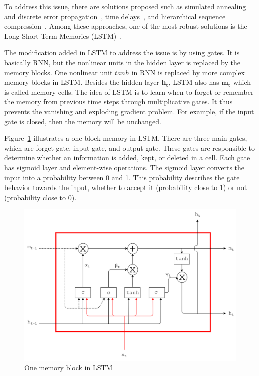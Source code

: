 To address this issue, there are solutions proposed such as simulated annealing and discrete error propagation~\citep{bengio1994learning}, time delays~\citep{lang1990time}, and hierarchical sequence compression~\citep{schmidhuber2007training}. Among these approaches, one of the most robust solutions is the Long Short Term Memories (LSTM)~\citep{hochreiter1997long}. 

The modification added in LSTM to address the issue is by using gates. It is basically RNN, but the nonlinear units in the hidden layer is replaced by the memory blocks. One nonlinear unit $tanh$ in RNN is replaced by more complex memory blocks in LSTM. Besides the hidden layer $\mathbf{h_{t}}$, LSTM also has $\mathbf{m_{t}}$ which is called memory cells.  The idea of LSTM is to learn when to forget or remember the memory from previous time steps through multiplicative gates. It thus prevents the vanishing and exploding gradient problem. For example, if the input gate is closed, then the memory will be unchanged.

Figure~\ref{fig:lstm} illustrates a one block memory in LSTM. There are three main gates, which are forget gate, input gate, and output gate. These gates are responsible to determine whether an information is added, kept, or deleted in a cell. Each gate has sigmoid layer and element-wise operations. The sigmoid layer converts the input into a probability between 0 and 1. This probability describes the gate behavior towards the input, whether to accept it (probability close to 1) or not (probability close to 0). 

\begin{figure}
	\centering
	\includegraphics[width=1.0\linewidth]{images/lstm}
	\caption{One memory block in LSTM~\citep{skripsiwahid}}
	\label{fig:lstm}
\end{figure}


